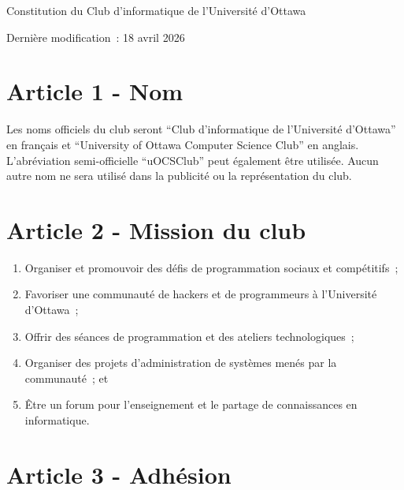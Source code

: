 \begin{center}
{ \LARGE Constitution du Club d'informatique de l'Université d'Ottawa }

Dernière modification~: 18 avril 2026
\end{center}

\section*{Article 1 - Nom}

Les noms officiels du club seront ``Club d'informatique de l'Université d'Ottawa'' en français
et ``University of Ottawa Computer Science Club'' en anglais.
L'abréviation semi-officielle ``uOCSClub'' peut également être utilisée.
Aucun autre nom ne sera utilisé dans la publicité ou la représentation du club.

\section*{Article 2 - Mission du club}


\begin{enumerate}
    \item Organiser et promouvoir des défis de programmation sociaux et compétitifs~;
    \item Favoriser une communauté de hackers et de programmeurs à l'Université d'Ottawa~;
    \item Offrir des séances de programmation et des ateliers technologiques~;
    \item Organiser des projets d'administration de systèmes menés par la communauté~; et
    \item Être un forum pour l'enseignement et le partage de connaissances en informatique.
\end{enumerate}

\section*{Article 3 - Adhésion}

